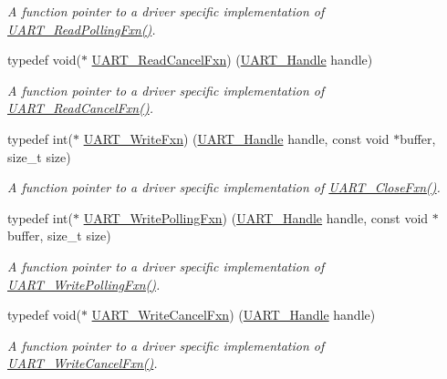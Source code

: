 \begin{DoxyCompactItemize}
\begin{DoxyCompactList}\small\item\em A function pointer to a driver specific implementation of \hyperlink{_u_a_r_t_8h_a6b57fb6a7c48272141a727c7de7290e4}{U\+A\+R\+T\+\_\+\+Read\+Polling\+Fxn()}. \end{DoxyCompactList}\item 
typedef void($\ast$ \hyperlink{_u_a_r_t_8h_aa46296acc2c197a775d44458e1eca197}{U\+A\+R\+T\+\_\+\+Read\+Cancel\+Fxn}) (\hyperlink{_u_a_r_t_8h_a13cc669fae768d8212e6491ce71b28af}{U\+A\+R\+T\+\_\+\+Handle} handle)
\begin{DoxyCompactList}\small\item\em A function pointer to a driver specific implementation of \hyperlink{_u_a_r_t_8h_aa46296acc2c197a775d44458e1eca197}{U\+A\+R\+T\+\_\+\+Read\+Cancel\+Fxn()}. \end{DoxyCompactList}\item 
typedef int($\ast$ \hyperlink{_u_a_r_t_8h_abe7ee32e202ad90d912b27693fe33672}{U\+A\+R\+T\+\_\+\+Write\+Fxn}) (\hyperlink{_u_a_r_t_8h_a13cc669fae768d8212e6491ce71b28af}{U\+A\+R\+T\+\_\+\+Handle} handle, const void $\ast$buffer, size\+\_\+t size)
\begin{DoxyCompactList}\small\item\em A function pointer to a driver specific implementation of \hyperlink{_u_a_r_t_8h_ae08ff15291bd6b21cb4e2eb1fce164a6}{U\+A\+R\+T\+\_\+\+Close\+Fxn()}. \end{DoxyCompactList}\item 
typedef int($\ast$ \hyperlink{_u_a_r_t_8h_a68d0b77abdb9da6a868edc6529ae70ff}{U\+A\+R\+T\+\_\+\+Write\+Polling\+Fxn}) (\hyperlink{_u_a_r_t_8h_a13cc669fae768d8212e6491ce71b28af}{U\+A\+R\+T\+\_\+\+Handle} handle, const void $\ast$buffer, size\+\_\+t size)
\begin{DoxyCompactList}\small\item\em A function pointer to a driver specific implementation of \hyperlink{_u_a_r_t_8h_a68d0b77abdb9da6a868edc6529ae70ff}{U\+A\+R\+T\+\_\+\+Write\+Polling\+Fxn()}. \end{DoxyCompactList}\item 
typedef void($\ast$ \hyperlink{_u_a_r_t_8h_ac5a3d974279a2d161746dfbc8ca91774}{U\+A\+R\+T\+\_\+\+Write\+Cancel\+Fxn}) (\hyperlink{_u_a_r_t_8h_a13cc669fae768d8212e6491ce71b28af}{U\+A\+R\+T\+\_\+\+Handle} handle)
\begin{DoxyCompactList}\small\item\em A function pointer to a driver specific implementation of \hyperlink{_u_a_r_t_8h_ac5a3d974279a2d161746dfbc8ca91774}{U\+A\+R\+T\+\_\+\+Write\+Cancel\+Fxn()}. \end{DoxyCompactList}\item 

\end{DoxyCompactItemize}
